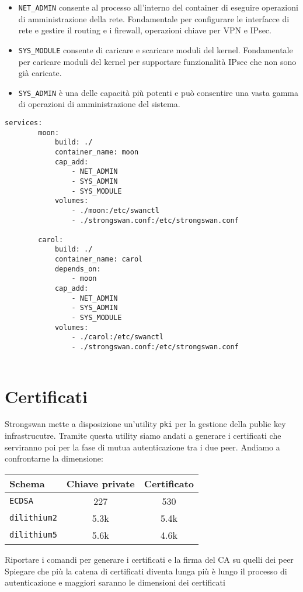 \begin{itemize}
    \item \texttt{NET\_ADMIN} consente al processo all'interno del
    container di eseguire operazioni di amministrazione della rete. 
    Fondamentale per configurare le interfacce di rete e gestire il routing e i
    firewall, operazioni chiave per VPN e IPsec.
    \item \texttt{SYS\_MODULE} consente di caricare e scaricare moduli
    del kernel. Fonda\-mentale per caricare moduli del kernel per supportare 
    funzionalità IPsec che non sono già caricate.
    \item \texttt{SYS\_ADMIN} è una delle capacità più potenti e può
    consentire una vasta gamma di operazioni di amministrazione del sistema.

\end{itemize}

\begin{lstlisting}[style=yaml]
    services: 
        moon: 
            build: ./ 
            container_name: moon 
            cap_add: 
                - NET_ADMIN 
                - SYS_ADMIN 
                - SYS_MODULE 
            volumes: 
                - ./moon:/etc/swanctl 
                - ./strongswan.conf:/etc/strongswan.conf 
        
        carol: 
            build: ./ 
            container_name: carol 
            depends_on: 
                - moon 
            cap_add: 
                - NET_ADMIN 
                - SYS_ADMIN 
                - SYS_MODULE 
            volumes: 
                - ./carol:/etc/swanctl 
                - ./strongswan.conf:/etc/strongswan.conf 
    
\end{lstlisting}

\section{Certificati}

Strongswan mette a disposizione un'utility \texttt{pki} per la gestione della public key infrastrucutre.
Tramite questa utility siamo andati a generare i certificati che serviranno poi per la fase di
mutua autenticazione tra i due peer.
Andiamo a confrontarne la dimensione:
\begin{table}[h]
    \centering
    \begin{tabular}{lcc}
        \toprule
        \textbf{Schema} & \textbf{Chiave private} & \textbf{Certificato} \\
        \midrule
        \texttt{ECDSA} & 227 & 530 \\
        \texttt{dilithium2} & 5.3k & 5.4k\\
        \texttt{dilithium5} & 5.6k & 4.6k\\
    \end{tabular}
\end{table}
    
Riportare i comandi per generare i certificati e la firma del CA su quelli dei peer
Spiegare che più la catena di certificati diventa lunga più è lungo il processo di autenticazione
e maggiori saranno le dimensioni dei certificati